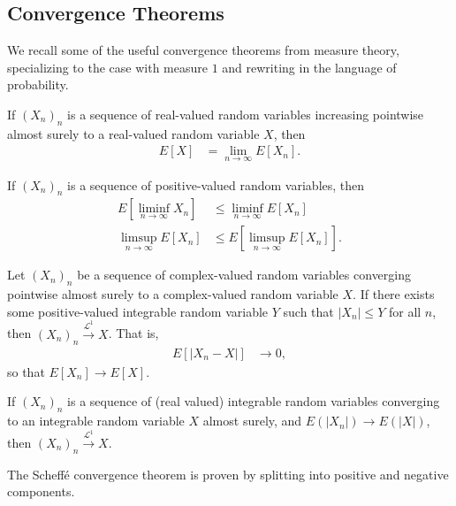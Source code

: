 \documentclass[10pt]{mypackage}
\begin{document}
\subsection{Convergence Theorems}%
We recall some of the useful convergence theorems from measure theory, specializing to the case with measure $1$ and rewriting in the language of probability.
\begin{theorem}
  If $\left( X_n \right)_n$ is a sequence of real-valued random variables increasing pointwise almost surely to a real-valued random variable $X$, then
  \begin{align*}
    E[X] &= \lim_{n\rightarrow\infty} E\left[ X_n \right].
  \end{align*}
\end{theorem}
\begin{theorem}
  If $\left( X_n \right)_n$ is a sequence of positive-valued random variables, then
  \begin{align*}
    E\left[ \liminf_{n\rightarrow\infty}X_n \right] &\leq \liminf_{n\rightarrow\infty} E\left[ X_n \right]\\
    \limsup_{n\rightarrow\infty} E\left[ X_n \right] &\leq E\left[ \limsup_{n\rightarrow\infty}E\left[ X_n \right] \right].
  \end{align*}
\end{theorem}
\begin{theorem}
  Let $\left( X_n \right)_n$ be a sequence of complex-valued random variables converging pointwise almost surely to a complex-valued random variable $X$. If there exists some positive-valued integrable random variable $Y$ such that $\left\vert X_n \right\vert\leq Y$ for all $n$, then $\left( X_n \right)_n\xrightarrow{\mathcal{L}^1}X$. That is,
  \begin{align*}
    E\left[ \left\vert X_n-X \right\vert \right] &\rightarrow 0,
  \end{align*}
  so that $E\left[ X_n \right]\rightarrow E\left[ X \right]$.
\end{theorem}
\begin{theorem}
  If $\left( X_n \right)_n$ is a sequence of (real valued) integrable random variables converging to an integrable random variable $X$ almost surely, and $E\left( \left\vert X_n \right\vert \right)\rightarrow E\left( \left\vert X \right\vert \right)$, then $\left( X_n \right)_n\xrightarrow{\mathcal{L}^1}X$.
\end{theorem}
\begin{remark}
  The Scheffé convergence theorem is proven by splitting into positive and negative components.
\end{remark}
\end{document}
